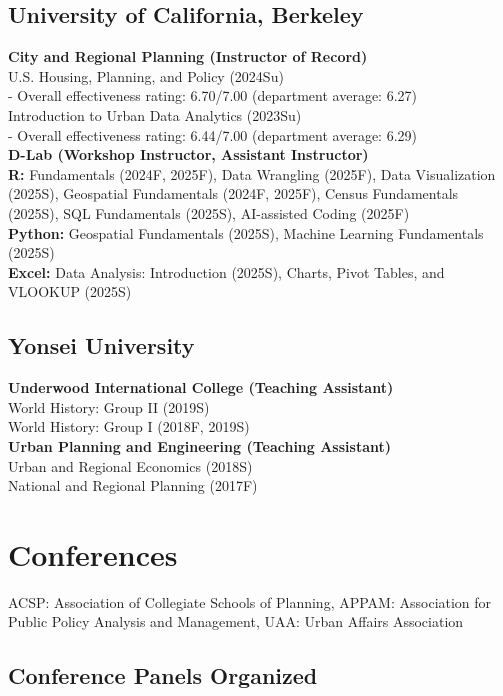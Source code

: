 \documentclass[11pt,letterpaper]{report}
\begin{document}
\subsection*{University of California, Berkeley}
\textbf{City and Regional Planning  (Instructor of Record)}\\[0.3em]
U.S. Housing, Planning, and Policy (2024Su)\\
- Overall effectiveness rating: 6.70/7.00 (department average: 6.27)\\[0.3em]
Introduction to Urban Data Analytics (2023Su)\\
- Overall effectiveness rating: 6.44/7.00 (department average: 6.29)\\[0.7em]
\textbf{D-Lab (Workshop Instructor, Assistant Instructor)}\\[0.3em]
\textbf{R:} Fundamentals (2024F, 2025F), Data Wrangling (2025F), Data Visualization (2025S), Geospatial Fundamentals (2024F, 2025F), Census Fundamentals (2025S), SQL Fundamentals (2025S), AI-assisted Coding (2025F)\\[0.3em]
\textbf{Python:} Geospatial Fundamentals (2025S), Machine Learning Fundamentals (2025S)\\[0.3em]
\textbf{Excel:} Data Analysis: Introduction (2025S), Charts, Pivot Tables, and VLOOKUP (2025S)

\subsection*{Yonsei University}
\textbf{Underwood International College (Teaching Assistant)}\\[0.3em]
World History: Group II (2019S)\\
World History: Group I  (2018F, 2019S)\\[0.7em]
\textbf{Urban Planning and Engineering (Teaching Assistant)}\\[0.3em]
Urban and Regional Economics (2018S)\\
National and Regional Planning (2017F)

\section*{Conferences}
ACSP: Association of Collegiate Schools of Planning, APPAM: Association for Public Policy Analysis and Management, UAA: Urban Affairs Association

\subsection*{Conference Panels Organized}
\end{document}
